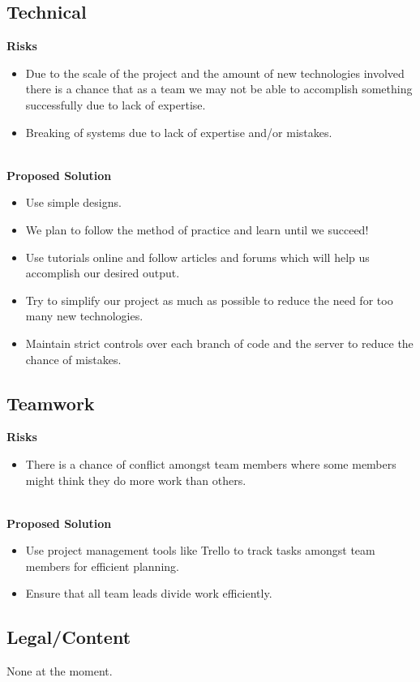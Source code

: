 \subsection{Technical}
\textbf{Risks}
\begin{itemize}
\item Due to the scale of the project and the amount of new technologies involved there is a chance that as a team we may not be able to accomplish something successfully due to lack of expertise.
\item Breaking of systems due to lack of expertise and/or mistakes.
\end{itemize}\hfill\\
\textbf{Proposed Solution}
\begin{itemize}
\item Use simple designs.
\item We plan to follow the method of practice and learn until we succeed!
\item Use tutorials online and follow articles and forums which will help us accomplish our desired output.
\item Try to simplify our project as much as possible to reduce the need for too many new technologies.
\item Maintain strict controls over each branch of code and the server to reduce the chance of mistakes.
\end{itemize}

\subsection{Teamwork}
\textbf{Risks}
\begin{itemize}
\item There is a chance of conflict amongst team members where some members might think they do more work than others.
\end{itemize}\hfill\\
\textbf{Proposed Solution}
\begin{itemize}
\item Use project management tools like Trello to track tasks amongst team members for efficient planning.
\item Ensure that all team leads divide work efficiently.
\end{itemize}

\subsection{Legal/Content}
None at the moment.